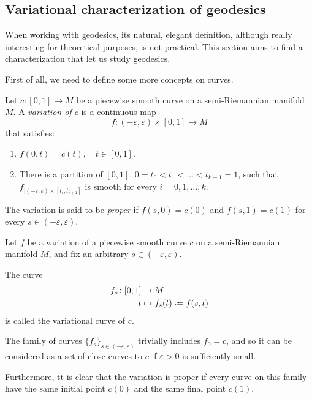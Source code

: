 \subsection{Variational characterization of geodesics}

When working with geodesics, its natural, elegant definition, although really interesting for theoretical purposes, is not practical. This section aims to find a characterization that let us study geodesics.

First of all, we need to define some more concepts on curves.

\begin{definition}
	Let $c \colon [0,1] \to M$ be a piecewise smooth curve on a semi-Riemannian manifold $M$. A \emph{variation of $c$} is a continuous map
	\[
		f \colon (-\varepsilon, \varepsilon) \times [0,1] \to M
	\]
	that satisfies:
	\begin{enumerate}
		\item $f(0,t) = c(t), \quad t\in[0,1]$.
		\item There is a partition of $[0,1]$, $0 = t_0 < t_1 < \dots < t_{k+1} = 1$, such that $f_{|(-\varepsilon, \varepsilon) \times [t_i,t_{i+1}]}$ is smooth for every $i = 0, 1, \dots, k$.
	\end{enumerate}

	The variation is said to be \emph{proper} if $f(s,0) = c(0)$ and $f(s,1) = c(1)$ for every $s \in (-\varepsilon, \varepsilon)$.
\end{definition}

\begin{definition}
	Let $f$ be a variation of a piecewise smooth curve $c$ on a semi-Riemannian manifold $M$, and fix an arbitrary $s \in (-\varepsilon, \varepsilon)$.
	
	The curve
	\begin{align*}
		f_s \colon [0,1] &\to M \\
		t &\mapsto f_s(t) \defeq f(s,t)
	\end{align*}
	is called the variational curve of $c$.
\end{definition}

The family of curves $\{f_s\}_{s\in (-\varepsilon, \varepsilon)}$ trivially includes $f_0 = c$, and so it can be considered as a set of close curves to $c$ if $\varepsilon > 0$ is sufficiently small.

Furthermore, tt is clear that the variation is proper if every curve on this family have the same initial point $c(0)$ and the same final point $c(1)$.

